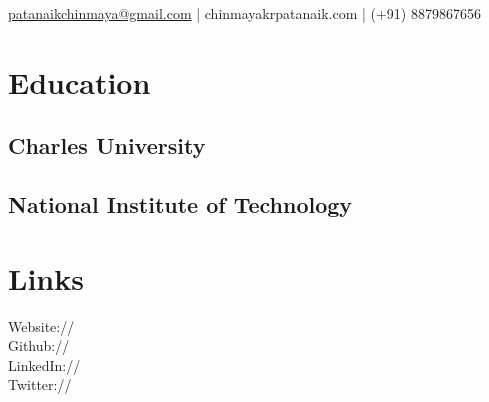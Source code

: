 \documentclass[]{deedy-resume-openfont}
\begin{document}
%
%


{ \href{mailto:patanaikchinmaya@gmail.com}{patanaikchinmaya@gmail.com} | chinmayakrpatanaik.com | (+91) 8879867656}

%
%

\begin{minipage}[t]{0.33\textwidth}


\section{Education}

\subsection{Charles University}
\sectionsep

\subsection{National Institute of Technology}
\sectionsep


\section{Links}
Website:// \href{http://www.chinmayakrpatanaik.com}{} \\
Github:// \href{https://github.com/pattu777}{} \\
LinkedIn://  \href{http://www.linkedin.com/in/chinmayakrpatanaik}{} \\
Twitter://  \href{https://twitter.com/CPatanaik}{}
\sectionsep



\end{minipage}
\end{document}
